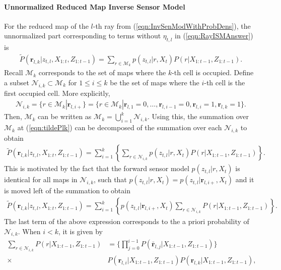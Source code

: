 \documentclass[smallextended]{svjour3}       %
\newcommand{\braces}[1]{\ensuremath{\left\{ #1 \right\}}}
\newcommand{\refeqn}[1]{(\ref{eqn:#1})}
\begin{document}
\paragraph{Unnormalized Reduced Map Inverse Sensor Model}
For the reduced map of the $l$-th ray from \refeqn{InvSenModWithProbDens}, the unnormalized part corresponding to terms without $\eta_{t,l}$ in \refeqn{RayISMAnswer} is %
\begin{align}
\tilde P(\mathbf{r}_{l,k}|z_{t,l},X_{1:t},Z_{1:t-1})%
= \sum_{r\in\mathcal{M}_{k}} p(z_{t,l}|r,X_t) P(r|X_{1:t-1},Z_{1:t-1}).\label{eqn:tildePlk}
\end{align}
Recall $\mathcal{M}_k$ corresponds to the set of maps where the $k$-th cell is occupied. Define a subset $\mathcal{N}_{i,k}\subset \mathcal{M}_k$ for $1\leq i\leq k$ be the set of maps where the $i$-th cell is the first occupied cell. More explicitly, 
\begin{align*}
\mathcal{N}_{i,k}  = \{ r\in\mathcal{M}_k| \mathbf{r}_{l,i+}\}
= \{ r\in\mathcal{M}_k| \mathbf{r}_{l,1}=0,\ldots, \mathbf{r}_{l,i-1}=0, \mathbf{r}_{l,i}=1,
\mathbf{r}_{l,k}=1\}.
\end{align*}
Then, $\mathcal{M}_k$ can be written as $\mathcal{M}_k =\bigcup_{i=1}^{k} \mathcal{N}_{i,k}$. Using this, the summation over $\mathcal{M}_k$ at \refeqn{tildePlk} can be decomposed of the summation over each $\mathcal{N}_{i,k}$ to obtain
\begin{align*}
\tilde P(\mathbf{r}_{l,k}|z_{t,l},X_{1:t},Z_{1:t-1}) = \sum_{i=1}^k\braces{\sum_{r\in\mathcal{N}_{i,k}} p(z_{t,l}|r,X_t) P(r|X_{1:t-1},Z_{1:t-1})}.
\end{align*}
This is motivated by the fact that the forward sensor model $p(z_{t,l}|r,X_t)$ is identical for all maps in $\mathcal{N}_{i,k}$, such that $p(z_{t,l}|r,X_t)=p(z_{t,l}|\mathbf{r}_{l,i+},X_t)$ and it is moved left of the summation to obtain
\begin{align}
\tilde P(\mathbf{r}_{l,k}|z_{t,l},X_{1:t},Z_{1:t-1})= \sum_{i=1}^k \braces{p(z_{t,l}|\mathbf{r}_{l,i+},X_t) \sum_{r\in\mathcal{N}_{i,k}} P(r|X_{1:t-1},Z_{1:t-1})}.\label{eqn:tildePlk0}
\end{align}
The last term of the above expression corresponds to the a priori probability of $\mathcal{N}_{i,k}$. When $i<k$, it is given by
\begin{align}
\sum_{r\in\mathcal{N}_{i,k}}  P(r|X_{1:t-1},Z_{1:t-1}) &= \bigg\{\prod_{j=0}^{i-1}P(\bar{\mathbf{r}}_{l,j}|X_{1:t-1},Z_{1:t-1})\bigg\}\nonumber\\
 \times &P({\mathbf{r}}_{l,i}|X_{1:t-1},Z_{1:t-1})P({\mathbf{r}}_{l,k}|X_{1:t-1},Z_{1:t-1}),\label{eqn:PNik}
\end{align}
\end{document}
